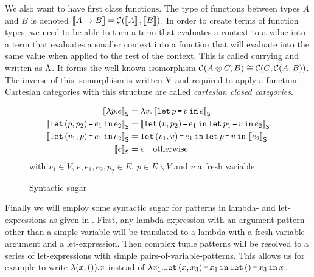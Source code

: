 \documentclass[runningheads,envcountsame]{llncs}
\begin{document}
    We also want to have first class functions. The type of functions between types $A$ and $B$ is denoted $\sem{\tfun{A}{B}} = \homC{\sem{A}}{\sem{B}}$. In order to create terms of function types, we need to be able to turn a term that evaluates a context to a value into a term that evaluates a smaller context into a function that will evaluate into the same value when applied to the rest of the context. This is called currying and written as $\curry$. It forms the well-known isomorphism $\homC{\tensor{A}{C}}{B} \cong \homC{C}{\homC{A}{B}}$. The inverse of this isomorphism is written $\uncurry$ and required to apply a function. Cartesian categories with this structure are called \emph{cartesian closed categories}.
    
\begin{figure}
        \begin{align*}
            \sugar{\elam{p}{e}} &= \elam{v}{\sugar{\elet{p}{v}{e}}} \\
            \sugar{\elet{\epair{p}{p_2}}{e_1}{e_2}} &= \sugar{\elet{\epair{v}{p_2}}{e_1}{\elet{p_1}{v}{e_2}}} \\
            \sugar{\elet{\epair{v_1}{p}}{e_1}{e_2}} &= \elet{\epair{v_1}{v}}{e_1}{\elet{p}{v}{\sugar{e_2}}} \\
            \sugar{e} &= e \quad \text{otherwise} 
        \end{align*}
        \hfill with $v_1 \in V$, $e, e_1, e_2, p_2 \in E$, $p \in E \backslash V$ and $v$ a fresh variable
        \caption{Syntactic sugar}
        \label{fig:syntactic-sugar1}
    \end{figure}
    
    Finally we will employ some syntactic sugar for patterns in lambda- and let-expressions as given in . First, any lambda-expression with an argument pattern other than a simple variable will be translated to a lambda with a fresh variable argument and a let-expression. Then complex tuple patterns will be resolved to a series of let-expressions with simple pairs-of-variable-patterns. This allows us for example to write $\lambda (x, ()). x$ instead of $\lambda x_1. \texttt{let}\,(x, x_3)\,\texttt{=}\,x_1\,\texttt{in}\,\texttt{let}\,()\,\texttt{=}\,x_3\,\texttt{in}\,x$.
    
\end{document}
